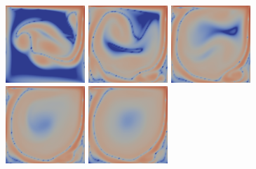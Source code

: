 \documentclass[english, nochinese]{pkupaper}
\begin{document}
\begin{figure}[htbp]
{{
\includegraphics[width=3cm]{Results/Figure02f.pdf}
\includegraphics[width=3cm]{Results/Figure02g.pdf}
\includegraphics[width=3cm]{Results/Figure02h.pdf}
\includegraphics[width=3cm]{Results/Figure02i.pdf}
\includegraphics[width=3cm]{Results/Figure02j.pdf}
}

}
\end{figure}
\end{document}
